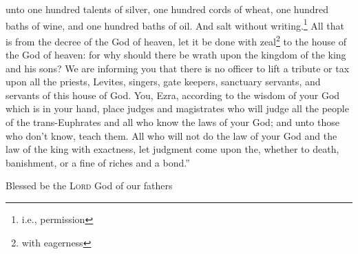 \begin{inparaenum}
     unto one hundred talents of silver, one hundred cords of wheat, one hundred baths of wine, and one hundred baths of oil. And salt without writing.\footnote{i.e., permission}%
     All that is from the decree of the God of heaven, let it be done with zeal\footnote{with eagerness} to the house of the God of heaven: for why should there be wrath upon the kingdom of the king and his sons?%
     We are informing you that there is no officer to lift a tribute or tax upon all the priests, Levites, singers, gate keepers, sanctuary servants, and servants of this house of God.%
     You, Ezra, according to the wisdom of your God which is in your hand, place judges and magistrates who will judge all the people of the trans-Euphrates and all who know the laws of your God; and unto those who don't know, teach them.%
     All who will not do the law of your God and the law of the king with exactness, let judgment come upon the, whether to death, banishment, or a fine of riches and a bond.''%
    
     Blessed be the \textsc{Lord} God of our fathers%
\end{inparaenum}
